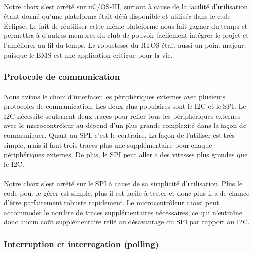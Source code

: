 		\paragraph*{}
		Notre choix s’est arrêté sur uC/OS-III, surtout à cause de la facilité d’utilisation étant donné qu’une plateforme était déjà disponible et utilisée dans le club Éclipse. Le fait de réutiliser cette même plateforme nous fait gagner du temps et permettra à d’autres membres du club de pouvoir facilement intégrer le projet et l’améliorer au fil du temps. La robustesse du RTOS était aussi un point majeur, puisque le BMS est une application critique pour la vie.

	\subsubsection{Protocole de communication}
		\paragraph*{}
		Nous avions le choix d’interfacer les périphériques externes avec plusieurs protocoles de communication. Les deux plus populaires sont le I2C et le SPI. Le I2C nécessite seulement deux traces pour relier tous les périphériques externes avec le microcontrôleur au dépend d’un plus grande complexité dans la façon de communiquer. Quant au SPI, c’est le contraire. La façon de l’utiliser est très simple, mais il faut trois traces plus une supplémentaire pour chaque périphériques externes. De plus, le SPI peut aller a des vitesses plus grandes que le I2C.

		\paragraph*{}
		Notre choix s’est arrêté sur le SPI à cause de sa simplicité d’utilisation. Plus le code pour le gérer est simple, plus il est facile à tester et donc plus il a de chance d’être parfaitement robuste rapidement. Le microcontrôleur choisi peut accommoder le nombre de traces supplémentaires nécessaires, ce qui n’entraîne donc aucun coût supplémentaire relié au désavantage du SPI par rapport au I2C.

	\subsubsection{Interruption et interrogation (polling)}
